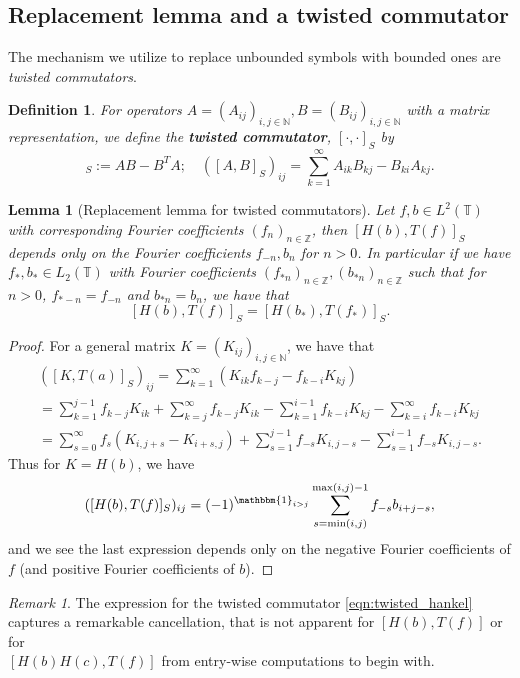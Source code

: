 \documentclass[11pt]{amsart}
\theoremstyle{plain}
\newtheorem{lemma}[theorem]{Lemma}
\newtheorem{definition}[theorem]{Definition}
\theoremstyle{remark}
\newtheorem{remark}[theorem]{Remark}
\numberwithin{equation}{section}
\begin{document}
\subsection{Replacement lemma and a twisted commutator}
The mechanism we utilize to replace unbounded symbols with bounded ones are \textit{twisted commutators}.
\begin{definition}
For operators $A=(A_{ij})_{i,j\in\mathbb{N}},  B=(B_{ij})_{i,j\in\mathbb{N}}$ with a matrix representation, we define the \textbf{twisted commutator}, $[\cdot, \cdot]_S$ by
\begin{equation}
[A,B]_S:=AB-B^TA; \quad ([A,B]_S)_{ij}=\sum_{k=1}^{\infty}A_{ik}B_{kj}- B_{ki}A_{kj}.
\end{equation}
\end{definition}

\begin{lemma}[Replacement lemma for twisted commutators]\label{lem:replacement}
Let $f, b\in L^2(\mathbb{T})$ with corresponding Fourier coefficients $(f_n)_{n\in\mathbb{Z}}$, then 
$[H(b), T(f)]_S$ depends only on the Fourier coefficients $f_{-n}, b_n$ for $n>0$. In particular if we have $f_*, b_*\in L_2(\mathbb{T})$ with Fourier coefficients 
$(f_{*n})_{n\in\mathbb{Z}}, (b_{*n})_{n\in\mathbb{Z}}$ such that for $n>0$, $f_{*-n}=f_{-n}$ and $b_{*n}=b_n$, we have that
$$[H(b), T(f)]_S = [H(b_*), T(f_*)]_S.$$ 
\end{lemma}
\begin{proof}
For a general matrix $K=(K_{ij})_{i,j\in\mathbb{N}}$, we have that
\begin{multline}
([K, T(a)]_S)_{ij}
= \sum_{k=1}^{\infty}\left(K_{ik}f_{k-j}- f_{k-i}K_{kj}\right)
\\=\sum_{k=1}^{j-1} f_{k-j} K_{ik}
+\sum_{k=j}^{\infty} f_{k-j} K_{ik}
- \sum_{k=1}^{i-1} f_{k-i}K_{kj} - \sum_{k=i}^{\infty} f_{k-i}K_{kj}
\\=\sum_{s=0}^{\infty} f_s(K_{i, j+s}- K_{i+s, j}) + \sum_{s=1}^{j-1} f_{-s}K_{i, j-s}- \sum_{s=1}^{i-1} f_{-s}K_{i, j-s}.
\end{multline}
Thus for $K=H(b)$, we have
\begin{equation}\label{eqn:twisted_hankel}
([H(b), T(f)]_S)_{ij}= (-1)^{\mathbbm{1}_{i>j}}    \sum_{s=\min(i,j)}^{\max(i,j)-1} f_{-s}b_{i+j-s},
\end{equation} 
and we see the last expression depends only on the negative Fourier coefficients of $f$ (and positive Fourier coefficients of $b$).
\end{proof}
\begin{remark}
The expression for the twisted commutator \eqref{eqn:twisted_hankel} captures a remarkable cancellation, that is not apparent for $[H(b), T(f)]$ or for 
\\$[H(b)H(c),T(f)]$ from entry-wise computations to begin with.
\end{remark}
\end{document}
